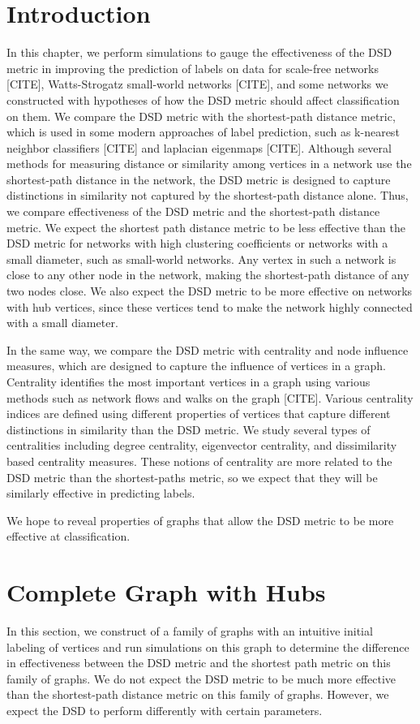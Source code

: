 \section{Introduction}

In this chapter, we perform simulations to gauge the effectiveness of the DSD metric in improving the prediction of labels on data for scale-free networks [CITE], Watts-Strogatz small-world networks [CITE], and some networks we constructed with hypotheses of how the DSD metric should affect classification on them. We compare the DSD metric with the shortest-path distance metric, which is used in some modern approaches of label prediction, such as k-nearest neighbor classifiers [CITE] and laplacian eigenmaps [CITE]. Although several methods for measuring distance or similarity among vertices in a network use the shortest-path distance in the network, the DSD metric is designed to capture distinctions in similarity not captured by the shortest-path distance alone. Thus, we compare effectiveness of the DSD metric and the shortest-path distance metric. We expect the shortest path distance metric to be less effective than the DSD metric for networks with high clustering coefficients or networks with a small diameter, such as small-world networks. Any vertex in such a network is close to any other node in the network, making the shortest-path distance of any two nodes close. We also expect the DSD metric to be more effective on networks with hub vertices, since these vertices tend to make the network highly connected with a small diameter.

In the same way, we compare the DSD metric with centrality and node influence measures, which are designed to capture the influence of vertices in a graph. Centrality identifies the most important vertices in a graph using various methods such as network flows and walks on the graph [CITE]. Various centrality indices are defined using different properties of vertices that capture different distinctions in similarity than the DSD metric. We study several types of centralities including degree centrality, eigenvector centrality, and dissimilarity based centrality measures. These notions of centrality are more related to the DSD metric than the shortest-paths metric, so we expect that they will be similarly effective in predicting labels.

We hope to reveal properties of graphs that allow the DSD metric to be more effective at classification.

\section{Complete Graph with Hubs}
In this section, we construct of a family of graphs with an intuitive initial labeling of vertices and run simulations on this graph to determine the difference in effectiveness between the DSD metric and the shortest path metric on this family of graphs. We do not expect the DSD metric to be much more effective than the shortest-path distance metric on this family of graphs. However, we expect the DSD to perform differently with certain parameters.

